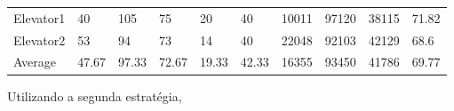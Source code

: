 ﻿\documentclass[a4paper]{article}
\begin{document}
\begin{table}[h]
\begin{tabular}{@{}llllllllll@{}}
Elevator1 & 40        & 105            & 75           & 20                                                               & 40                                                                  & 10011                                                         & 97120                                                 & 38115                                                   & 71.82        \\
Elevator2 & 53       & 94            & 73           & 14                                                               & 40                                                                  & 22048                                                         & 92103                                                 & 42129                                                   & 68.6         \\
Average   & 47.67     & 97.33         & 72.67        & 19.33                                                               & 42.33                                                               & 16355                                                         & 93450                                                 &   41786                                                 & 69.77         \\ \bottomrule
\end{tabular}
\end{table}

\newpage

Utilizando a segunda estratégia,
\end{document}
